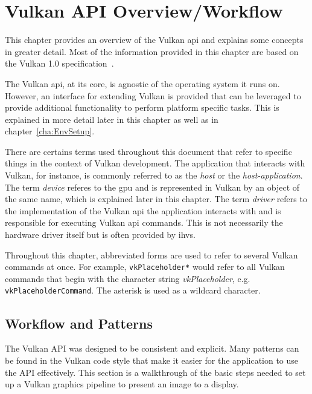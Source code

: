 
\chapter{Vulkan API Overview/Workflow}
\label{cha:VulkanOverview}

  This chapter provides an overview of the Vulkan \gls{api} and explains some concepts in greater detail. Most of the information provided in this chapter are based on the Vulkan 1.0 specification~\cite{vkspec}.

  The Vulkan \gls{api}, at its core, is agnostic of the operating system it runs on.
  However, an interface for extending Vulkan is provided that can be leveraged to provide additional functionality to perform platform specific tasks. This is explained in more detail later in this chapter as well as in chapter~\ref{cha:EnvSetup}.

  There are certains terms used throughout this document that refer to specific things in the context of Vulkan development.
  The application that interacts with Vulkan, for instance, is commonly referred to as the \textit{host} or the \textit{host-application}.
  The term \textit{device} referes to the \gls{gpu} and is represented in Vulkan by an object of the same name, which is explained later in this chapter.
  The term \textit{\gls{driver}} refers to the implementation of the Vulkan \gls{api} the application interacts with and is responsible for executing Vulkan \gls{api} commands.
  This is not necessarily the hardware driver itself but is often provided by \glspl{ihv}.

  Throughout this chapter, abbreviated forms are used to refer to several Vulkan commands at once.
  For example, \lstinline{vkPlaceholder*} would refer to all Vulkan commands that begin with the character string \textit{vkPlaceholder}, e.g. \lstinline{vkPlaceholderCommand}. The asterisk is used as a wildcard character.

  \section{Workflow and Patterns}
  \label{sec:WorkflowAndPatterns}
    The Vulkan API was designed to be consistent and explicit. Many patterns can be found in the Vulkan code style that make it easier for the \gls{application} to use the API effectively. This section is a walkthrough of the basic steps needed to set up a Vulkan graphics pipeline to present an image to a display.

